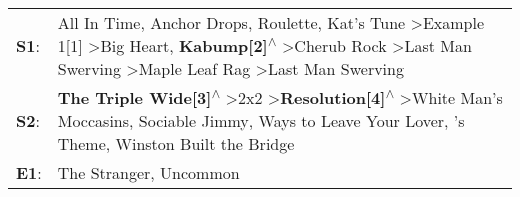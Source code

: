 \begin{supertabular}{p{0.03\textwidth}p{0.92\textwidth}}
 \textbf{S1}:  &  All In Time\textsuperscript{}, \enspace Anchor Drops\textsuperscript{}, \enspace Roulette\textsuperscript{}, \enspace Kat's Tune\textsuperscript{} \textgreater \enspace Example 1[1]\textsuperscript{} \textgreater \enspace Big Heart\textsuperscript{}, \enspace \textbf{Kabump[2]\textsuperscript{$\wedge$}} \textgreater \enspace Cherub Rock\textsuperscript{} \textgreater \enspace Last Man Swerving\textsuperscript{} \textgreater \enspace Maple Leaf Rag\textsuperscript{} \textgreater \enspace Last Man Swerving\textsuperscript{}  \enspace  \\
 \textbf{S2}:  &                                                                                                            \textbf{The Triple Wide[3]\textsuperscript{$\wedge$}} \textgreater \enspace 2x2\textsuperscript{} \textgreater \enspace \textbf{Resolution[4]\textsuperscript{$\wedge$}} \textgreater \enspace White Man's Moccasins\textsuperscript{}, \enspace Sociable Jimmy\textsuperscript{},  Ways to Leave Your Lover\textsuperscript{}, 's Theme\textsuperscript{}, \enspace Winston Built the Bridge\textsuperscript{}  \enspace  \\
 \textbf{E1}:  &                                                                                                                                                                                                                                                                                                                                                                                                                                                                              The Stranger\textsuperscript{}, \enspace Uncommon\textsuperscript{}  \enspace  \\
\end{supertabular}
